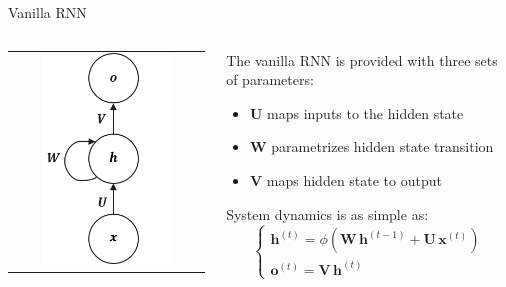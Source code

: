 \documentclass[aspectratio=169]{beamer}
\begin{document}

\begin{frame}{Vanilla RNN}
\begin{columns}
\begin{column}{0.3\textwidth}
\begin{tabular}{c}
	\includegraphics[width=0.7\textwidth]{img/rnn/vanilla_rnn.png}
\end{tabular}
\end{column}
\begin{column}{0.7\textwidth}
The vanilla RNN is provided with three sets of parameters:
\begin{itemize}
	\item $\bm{U}$ maps inputs to the hidden state
	\item $\bm{W}$ parametrizes hidden state transition
	\item $\bm{V}$ maps hidden state to output 
\end{itemize}
\vspace{0.5cm}
System dynamics is as simple as:
\begin{equation}
	\begin{cases}
	\bm{h}^{(t)} = \phi(\bm{W}\,\bm{h}^{(t-1)} + \bm{U}\,\bm{x}^{(t)})\\
	\bm{o}^{(t)} = \bm{V}\,\bm{h}^{(t)}
	\end{cases}
\end{equation}
\end{column}
\end{columns}
\end{frame}
\end{document}
